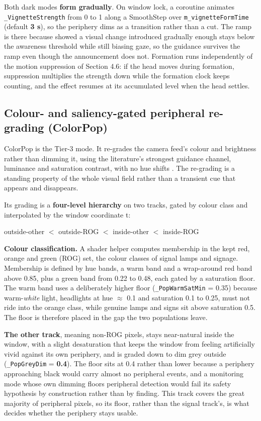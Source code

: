 Both dark modes \textbf{form gradually}. On window lock, a coroutine animates
\verb|_VignetteStrength| from 0 to 1 along a SmoothStep over \verb|m_vignetteFormTime| (default
\textbf{3 s}), so the periphery dims as a transition rather than a cut. The ramp is there because
\citet{hata2016} showed a visual change introduced gradually enough stays below the awareness
threshold while still biasing gaze, so the guidance survives the ramp even though the announcement
does not. Formation runs independently of the motion suppression of Section 4.6: if the head moves
during formation, suppression multiplies the strength down while the formation clock keeps counting,
and the effect resumes at its accumulated level when the head settles.

\subsection{Colour- and saliency-gated peripheral re-grading (ColorPop)}

ColorPop is the Tier-3 mode. It re-grades the camera feed's colour and brightness rather than dimming
it, using the literature's strongest guidance channel, luminance and saturation contrast, with no hue
shifts \citep{bailey2009,grogorick2017,sutton2022}. The re-grading is a standing property of the
whole visual field rather than a transient cue that appears and disappears.

Its grading is a \textbf{four-level hierarchy} on two tracks, gated by colour class and interpolated
by the window coordinate t:

\begin{center}
outside-other $<$ outside-ROG $<$ inside-other $<$ inside-ROG
\end{center}

\textbf{Colour classification.} A shader helper computes membership in the kept red, orange and green
(ROG) set, the colour classes of signal lamps and signage. Membership is defined by hue bands, a warm
band and a wrap-around red band above 0.85, plus a green band from 0.22 to 0.48, each gated by a
saturation floor. The warm band uses a deliberately higher floor (\verb|_PopWarmSatMin| = 0.35)
because warm-\textit{white} light, headlights at hue $\approx$ 0.1 and saturation 0.1 to 0.25, must
not ride into the orange class, while genuine lamps and signs sit above saturation 0.5. The floor is
therefore placed in the gap the two populations leave.

\textbf{The other track}, meaning non-ROG pixels, stays near-natural inside the window, with a slight
desaturation that keeps the window from feeling artificially vivid against its own periphery, and is
graded down to dim grey outside (\verb|_PopGreyDim| = \textbf{0.4}). The floor sits at 0.4 rather
than lower because a periphery approaching black would carry almost no peripheral events, and a
monitoring mode whose own dimming floors peripheral detection would fail its safety hypothesis by
construction rather than by finding. This track covers the great majority of peripheral pixels, so
its floor, rather than the signal track's, is what decides whether the periphery stays usable.

